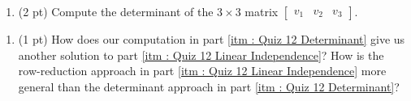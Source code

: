 \begin{enumerate}[resume,label=(\alph*)]
\item\label{itm : Quiz 12 Determinant} (2 pt) Compute the determinant of the $3 \times 3$ matrix $\begin{bmatrix}v_{1}&v_{2}&v_{3}\end{bmatrix}$. 
\end{enumerate}




\begin{enumerate}[resume,label=(\alph*)]
\item\label{itm : Quiz 12 Nonzero Determinant} (1 pt) How does our computation in part \ref{itm : Quiz 12 Determinant} give us another solution to part \ref{itm : Quiz 12 Linear Independence}? How is the row-reduction approach in part \ref{itm : Quiz 12 Linear Independence} more general than the determinant approach in part \ref{itm : Quiz 12 Determinant}?
\end{enumerate}

